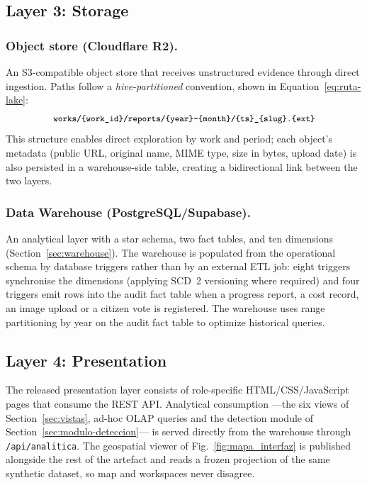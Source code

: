 \documentclass[runningheads]{llncs}
\renewcommand{\_}{\origunderscore\allowbreak}
\begin{document}
\subsection{Layer 3: Storage}
\label{sec:l3}

\subsubsection{Object store (Cloudflare R2).}
An S3-compatible object store that receives unstructured evidence through direct ingestion. Paths follow a \textit{hive-partitioned} convention, shown in Equation~\eqref{eq:ruta-lake}:
\begin{equation}
\small\texttt{works/\{work\_id\}/reports/\{year\}-\{month\}/\{ts\}\_\{slug\}.\{ext\}}
\label{eq:ruta-lake}
\end{equation}
This structure enables direct exploration by work and period; each object's metadata (public URL, original name, MIME type, size in bytes, upload date) is also persisted in a warehouse-side table, creating a bidirectional link between the two layers.

\subsubsection{Data Warehouse (PostgreSQL/Supabase).}
An analytical layer with a star schema, two fact tables, and ten dimensions (Section~\ref{sec:warehouse}). The warehouse is populated from the operational schema by database triggers rather than by an external ETL job: eight triggers synchronise the dimensions (applying SCD~2 versioning where required) and four triggers emit rows into the audit fact table when a progress report, a cost record, an image upload or a citizen vote is registered. The warehouse uses range partitioning by year on the audit fact table to optimize historical queries.

\subsection{Layer 4: Presentation}
\label{sec:l4}
The released presentation layer consists of role-specific HTML/CSS/JavaScript pages that consume the REST API. Analytical consumption ---the six views of Section~\ref{sec:vistas}, ad-hoc OLAP queries and the detection module of Section~\ref{sec:modulo-deteccion}--- is served directly from the warehouse through \texttt{/api/analitica}. The geospatial viewer of Fig.~\ref{fig:mapa_interfaz} is published alongside the rest of the artefact and reads a frozen projection of the same synthetic dataset, so map and workspaces never disagree.
\end{document}
